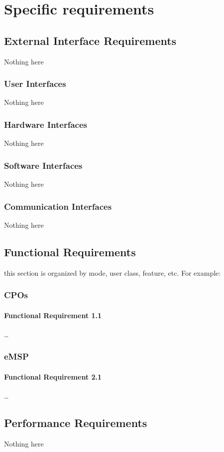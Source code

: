 \section{Specific requirements}

\subsection{External Interface Requirements}
Nothing here

\subsubsection{User Interfaces}
Nothing here

\subsubsection{Hardware Interfaces}
Nothing here

\subsubsection{Software Interfaces}
Nothing here

\subsubsection{Communication Interfaces}
Nothing here


\subsection{Functional Requirements}
this section is organized by mode, user class,
feature, etc. For example:
\subsubsection{CPOs}
\paragraph*{Functional Requirement 1.1}
\dots
\subsubsection{eMSP}
\paragraph*{Functional Requirement 2.1}
\dots

\subsection{Performance Requirements}
Nothing here

